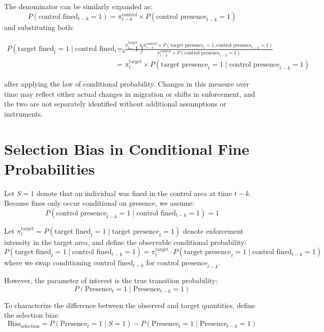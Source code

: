 \documentclass[12pt]{article}
\begin{document}
\begin{appendices}
\quad The denominator can be similarly expanded as:
\begin{equation*}
P(\text{control fined}_{t-k} = 1) = \pi^{\text{control}}_{t-k} \times P(\text{control presence}_{t-k} = 1)
\end{equation*}
and substituting both:
\begin{footnotesize}
\begin{align*}
P(\text{target fined}_t = 1 \mid \text{control fined}_{t-k} = 1)
&=
\frac{
\pi^{\text{target}}_t \times \pi^{\text{control}}_{t-k} \times P(\text{target presence}_t = 1, \text{control presence}_{t-k} = 1)
}{
\pi^{\text{control}}_{t-k} \times P(\text{control presence}_{t-k} = 1)
} \\
&=
\pi^{\text{target}}_t \times P(\text{target presence}_t = 1 \mid \text{control presence}_{t-k} = 1)
\end{align*}
\end{footnotesize}
after applying the law of conditional probability. Changes in this measure over time may reflect either actual changes in migration or shifts in enforcement, and the two are not separately identified without additional assumptions or instruments.


\section*{Selection Bias in Conditional Fine Probabilities}

Let $S = 1$ denote that an individual was fined in the control area at time $t-k$. Because fines only occur conditional on presence, we assume:
\[
P(\text{control presence}_{t-k} = 1 \mid \text{control fined}_{t-k} = 1) = 1
\]

Let $\pi^{\text{target}}_t = P(\text{target fined}_t = 1 \mid \text{target presence}_t = 1)$ denote enforcement intensity in the target area, and define the observable conditional probability:
\[
P(\text{target fined}_t = 1 \mid \text{control fined}_{t-k} = 1)
= \pi^{\text{target}}_t \cdot P(\text{target presence}_t = 1 \mid \text{control fined}_{t-k}= 1)
\]
where we swap conditioning $\text{control fined}_{t-k}$ for $\text{control presence}_{t-k}$. 

However, the parameter of interest is the true transition probability:
\[
P(\text{Presence}_t = 1 \mid \text{Presence}_{t-k} = 1)
\]

To characterize the difference between the observed and target quantities, define the selection bias:
\[
\text{Bias}_{\text{selection}} =
P(\text{Presence}_t = 1 \mid S = 1)
-
P(\text{Presence}_t = 1 \mid \text{Presence}_{t-k} = 1)
\]


\end{appendices}
\end{document}
